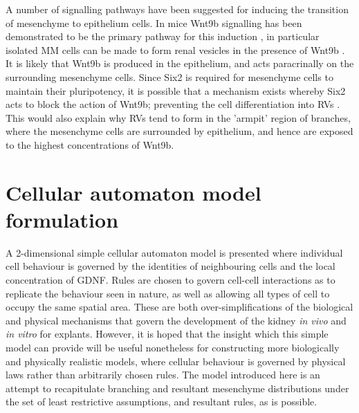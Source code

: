 \documentclass[pdftex,10pt,a4paper,twocolumn]{article}
\begin{document}
A number of signalling pathways have been suggested for inducing the transition of mesenchyme to epithelium cells. In mice Wnt9b signalling has been demonstrated to be the primary pathway for this induction \cite{LittleMMcMahon2012}, in particular isolated MM cells can be made to form renal vesicles in the presence of Wnt9b \cite{carroll2005wnt9b}. It is likely that Wnt9b is produced in the epithelium, and acts paracrinally on the surrounding mesenchyme cells. Since Six2 is required for mesenchyme cells to maintain their pluripotency, it is possible that a mechanism exists whereby Six2 acts to block the action of Wnt9b; preventing the cell differentiation into RVs \cite{LittleMMcMahon2012}. This would also explain why RVs tend to form in the 'armpit' region of branches, where the mesenchyme cells are surrounded by epithelium, and hence are exposed to the highest concentrations of Wnt9b.

\section{Cellular automaton model formulation}
A 2-dimensional simple cellular automaton model is presented where individual cell behaviour is governed by the identities of neighbouring cells and the local concentration of GDNF. Rules are chosen to govern cell-cell interactions as to replicate the behaviour seen in nature, as well as allowing all types of cell to occupy the same spatial area. These are both over-simplifications of the biological and physical mechanisms that govern the development of the kidney \textit{in vivo} and \textit{in vitro} for explants. However, it is hoped that the insight which this simple model can provide will be useful nonetheless for constructing more biologically and physically realistic models, where cellular behaviour is governed by physical laws rather than arbitrarily chosen rules. The model introduced here is an attempt to recapitulate branching and resultant mesenchyme distributions under the set of least restrictive assumptions, and resultant rules, as is possible.
\end{document}
